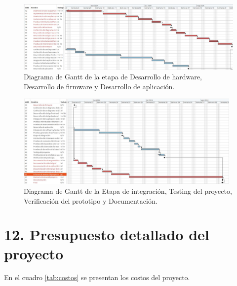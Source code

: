 \documentclass[
11pt, %
]{charter}
\begin{document}
\begin{figure}[htpb]
\centering 
\includegraphics[width=1.0\textwidth, height=.43 \textwidth]{./Figuras/ganttProyecto2.pdf}
\caption{Diagrama de Gantt de la etapa de Desarrollo de hardware, Desarrollo de firmware y Desarrollo de aplicación.}
\label{fig:gantt2}
\end{figure}


\begin{figure}[htpb]
\centering 
\includegraphics[width=0.98\textwidth, height=.43 \textwidth]{./Figuras/ganttProyecto3.pdf}
\caption{Diagrama de Gantt de la Etapa de integración, Testing del proyecto, Verificación del prototipo y Documentación.}
\label{fig:gantt3}
\end{figure}



\section{12. Presupuesto detallado del proyecto}
\label{sec:presupuesto}



En el cuadro \ref{tab:costos} se presentan los costos del proyecto. 
\end{document}

